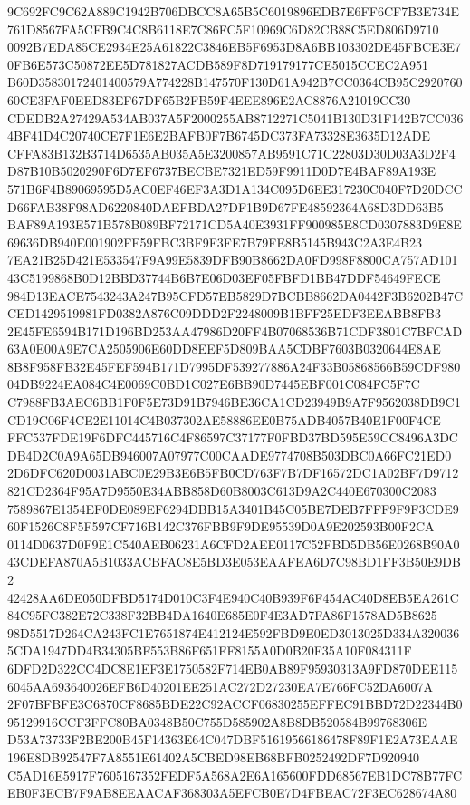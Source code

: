 \documentclass[UTF8,fontset=fandol,zihao=-4,a4paper]{ctexart}
\begin{document}
{{9C692FC9C62A889C1942B706DBCC8A65B5C6019896EDB7E6FF6CF7B3E734E761D8567FA5CFB9C4C8B6118E7C86FC5F10969C6D82CB88C5ED806D9710
0092B7EDA85CE2934E25A61822C3846EB5F6953D8A6BB103302DE45FBCE3E70FB6E573C50872EE5D781827ACDB589F8D719179177CE5015CCEC2A951
B60D35830172401400579A774228B147570F130D61A942B7CC0364CB95C292076060CE3FAF0EED83EF67DF65B2FB59F4EEE896E2AC8876A21019CC30
CDEDB2A27429A534AB037A5F2000255AB8712271C5041B130D31F142B7CC0364BF41D4C20740CE7F1E6E2BAFB0F7B6745DC373FA73328E3635D12ADE
CFFA83B132B3714D6535AB035A5E3200857AB9591C71C22803D30D03A3D2F4D87B10B5020290F6D7EF6737BECBE7321ED59F9911D0D7E4BAF89A193E
571B6F4B89069595D5AC0EF46EF3A3D1A134C095D6EE317230C040F7D20DCCD66FAB38F98AD6220840DAEFBDA27DF1B9D67FE48592364A68D3DD63B5
BAF89A193E571B578B089BF72171CD5A40E3931FF900985E8CD0307883D9E8E69636DB940E001902FF59FBC3BF9F3FE7B79FE8B5145B943C2A3E4B23
7EA21B25D421E533547F9A99E5839DFB90B8662DA0FD998F8800CA757AD10143C5199868B0D12BBD37744B6B7E06D03EF05FBFD1BB47DDF54649FECE
984D13EACE7543243A247B95CFD57EB5829D7BCBB8662DA0442F3B6202B47CCED1429519981FD0382A876C09DDD2F2248009B1BFF25EDF3EEABB8FB3
2E45FE6594B171D196BD253AA47986D20FF4B07068536B71CDF3801C7BFCAD63A0E00A9E7CA2505906E60DD8EEF5D809BAA5CDBF7603B0320644E8AE
8B8F958FB32E45FEF594B171D7995DF539277886A24F33B05868566B59CDF98004DB9224EA084C4E0069C0BD1C027E6BB90D7445EBF001C084FC5F7C
C7988FB3AEC6BB1F0F5E73D91B7946BE36CA1CD23949B9A7F9562038DB9C1CD19C06F4CE2E11014C4B037302AE58886EE0B75ADB4057B40E1F00F4CE
FFC537FDE19F6DFC445716C4F86597C37177F0FBD37BD595E59CC8496A3DCDB4D2C0A9A65DB946007A07977C00CAADE9774708B503DBC0A66FC21ED0
2D6DFC620D0031ABC0E29B3E6B5FB0CD763F7B7DF16572DC1A02BF7D9712821CD2364F95A7D9550E34ABB858D60B8003C613D9A2C440E670300C2083
7589867E1354EF0DE089EF6294DBB15A3401B45C05BE7DEB7FFF9F9F3CDE960F1526C8F5F597CF716B142C376FBB9F9DE95539D0A9E202593B00F2CA
0114D0637D0F9E1C540AEB06231A6CFD2AEE0117C52FBD5DB56E0268B90A043CDEFA870A5B1033ACBFAC8E5BD3E053EAAFEA6D7C98BD1FF3B50E9DB2
42428AA6DE050DFBD5174D010C3F4E940C40B939F6F454AC40D8EB5EA261C84C95FC382E72C338F32BB4DA1640E685E0F4E3AD7FA86F1578AD5B8625
98D5517D264CA243FC1E7651874E412124E592FBD9E0ED3013025D334A3200365CDA1947DD4B34305BF553B86F651FF8155A0D0B20F35A10F084311F
6DFD2D322CC4DC8E1EF3E1750582F714EB0AB89F95930313A9FD870DEE1156045AA693640026EFB6D40201EE251AC272D27230EA7E766FC52DA6007A
2F07BFBFE3C6870CF8685BDE22C92ACCF06830255EFFEC91BBD72D22344B095129916CCF3FFC80BA0348B50C755D585902A8B8DB520584B99768306E
D53A73733F2BE200B45F14363E64C047DBF51619566186478F89F1E2A73EAAE196E8DB92547F7A8551E61402A5CBED98EB68BFB0252492DF7D920940
C5AD16E5917F7605167352FEDF5A568A2E6A165600FDD68567EB1DC78B77FCEB0F3ECB7F9AB8EEAACAF368303A5EFCB0E7D4FBEAC72F3EC628674A80
}}
\end{document}
